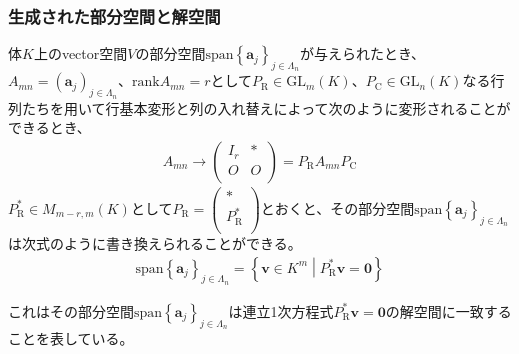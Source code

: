 \documentclass[dvipdfmx]{jsarticle}
\begin{document}
\subsubsection{生成された部分空間と解空間}%
\begin{thm}\label{2.1.8.11}
体$K$上のvector空間$V$の部分空間${\mathrm{span} }\left\{ \mathbf{a}_{j} \right\}_{j \in \varLambda_{n}}$が与えられたとき、$A_{mn} = \left( \mathbf{a}_{j} \right)_{j \in \varLambda_{n}}$、${\mathrm{rank}}A_{mn} = r$として$P_{\mathrm{R}} \in {\mathrm{GL}}_{m}(K)$、$P_{\mathrm{C}} \in {\mathrm{GL}}_{n}(K)$なる行列たちを用いて行基本変形と列の入れ替えによって次のように変形されることができるとき、
\begin{align*}
A_{mn} \rightarrow \begin{pmatrix}
I_{r} & * \\
O & O \\
\end{pmatrix} = P_{\mathrm{R}}A_{mn}P_{\mathrm{C}}
\end{align*}
$P_{\mathrm{R}}^{*} \in M_{m - r,m}(K)$として$P_{\mathrm{R}} = \begin{pmatrix}
* \\
P_{\mathrm{R}}^{*} \\
\end{pmatrix}$とおくと、その部分空間${\mathrm{span} }\left\{ \mathbf{a}_{j} \right\}_{j \in \varLambda_{n}}$は次式のように書き換えられることができる。
\begin{align*}
{\mathrm{span} }\left\{ \mathbf{a}_{j} \right\}_{j \in \varLambda_{n}} = \left\{ \mathbf{v} \in K^{m} \middle| P_{\mathrm{R}}^{*}\mathbf{v} = \mathbf{0} \right\}
\end{align*}
\end{thm}\par
これはその部分空間${\mathrm{span} }\left\{ \mathbf{a}_{j} \right\}_{j \in \varLambda_{n}}$は連立1次方程式$P_{\mathrm{R}}^{*}\mathbf{v} = \mathbf{0}$の解空間に一致することを表している。
\end{document}
